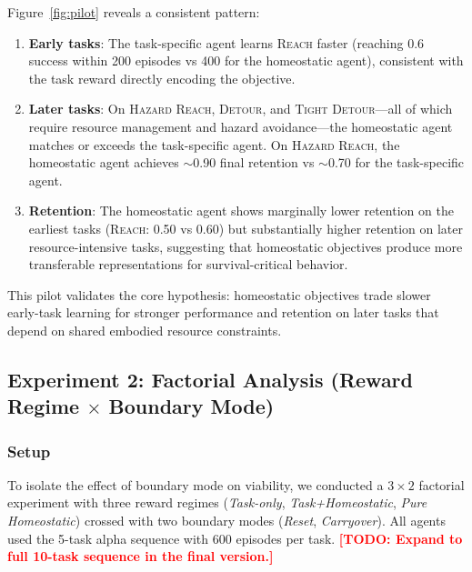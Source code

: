 \documentclass{article}
\newcommand{\todo}[1]{\textcolor{red}{\textbf{[TODO: #1]}}}
\begin{document}
Figure~\ref{fig:pilot} reveals a consistent pattern:

\begin{enumerate}[leftmargin=*,topsep=1pt,itemsep=1pt]
  \item \textbf{Early tasks}: The task-specific agent learns \textsc{Reach}
        faster (reaching 0.6 success within 200 episodes vs 400 for the
        homeostatic agent), consistent with the task reward directly encoding
        the objective.
  \item \textbf{Later tasks}: On \textsc{Hazard Reach}, \textsc{Detour},
        and \textsc{Tight Detour}---all of which require resource management
        and hazard avoidance---the homeostatic agent matches or exceeds the
        task-specific agent. On \textsc{Hazard Reach}, the homeostatic
        agent achieves $\sim$0.90 final retention vs $\sim$0.70 for the
        task-specific agent.
  \item \textbf{Retention}: The homeostatic agent shows marginally lower
        retention on the earliest tasks (\textsc{Reach}: 0.50 vs 0.60)
        but substantially higher retention on later resource-intensive
        tasks, suggesting that homeostatic objectives produce more
        transferable representations for survival-critical behavior.
\end{enumerate}

This pilot validates the core hypothesis: homeostatic objectives trade
slower early-task learning for stronger performance and retention on later
tasks that depend on shared embodied resource constraints.

\subsection{Experiment 2: Factorial Analysis (Reward Regime $\times$ Boundary Mode)}
\label{sec:factorial}

\subsubsection{Setup}

To isolate the effect of boundary mode on viability, we conducted a
$3 \times 2$ factorial experiment with three reward regimes (\emph{Task-only},
\emph{Task+Homeostatic}, \emph{Pure Homeostatic}) crossed with two
boundary modes (\emph{Reset}, \emph{Carryover}). All agents used the
5-task alpha sequence with 600 episodes per task.
\todo{Expand to full 10-task sequence in the final version.}
\end{document}
